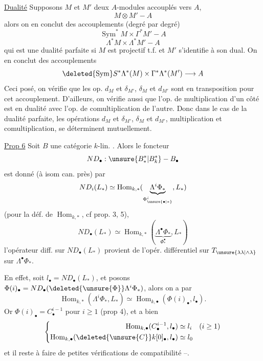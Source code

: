 \uline{Dualité} Supposons $M$ et $M'$ deux $A$-modules accouplés vers $A$,
\[
M\otimes M'-A
\]
alors on en conclut des accouplements (degré par degré)
\[
\operatorname{Sym}^*M\times\Gamma^*M'-A
\]
\[
\Lambda^*M\times\Lambda^*M'-A
\]
qui est une dualité parfaite si $M$ est projectif t.f. et $M'$ s'identifie à son dual. On en conclut des accouplements
\[
\deleted{\operatorname{Sym}}S^*\Lambda^*(M)\times\Gamma^*\Lambda^*(M')\longrightarrow A
\]
Ceci posé, on vérifie que les op. $d_M$ et $\delta_{M'}$, $\delta_M$ et $d_{M'}$ sont  en transposition pour cet accouplement. D'ailleurs, on vérifie aussi que l'op. de multiplication d'un côté est en dualité avec l'op. de comultiplication de l'autre. Donc dans le cas de la dualité parfaite, les opérations $d_M$ et $\delta_{M'}$, $\delta_M$ et $d_{M'}$, multiplication et comultiplication, se déterminent mutuellement.


\uline{Prop 6} Soit $B$ une catégorie $k$-lin. .
Alors le foncteur
\[
ND_\bullet:\unsure{B^*_*|B^*_k}\mathbin{-}B_\bullet
\]
est donné (à isom can. près) par
\[
ND_i(L_*)\simeq\operatorname{Hom}_{k,*}
(\underbrace{\Lambda^i\Phi_*}_{\Phi^i_{\unsure{\bullet|*}}},L_*)
\]
(pour la déf. de $\operatorname{Hom}_{k,*}$, cf prop. 3, 5),
\[
ND_\bullet(L_*)\simeq\operatorname{Hom}_{k,*}
(\underbrace{\Lambda^\bullet\Phi_*}_{\Phi_*^\bullet},L_*)
\]
l'opérateur diff. sur $ND_\bullet(L_*)$ provient de l'opér. différentiel sur
$T_{\unsure{\lambda\lambda|\wedge\lambda}}$ sur $\Lambda^\bullet\Phi_*$.

En effet,  soit $l_\bullet=ND_\bullet(L_*)$,
et posons $\Phi(i)_\bullet=ND_\bullet(\deleted{\unsure{\Phi}}\Lambda^i\Phi_*)$,
alors on a par 
\[
\operatorname{Hom}_{k,*}(\Lambda^i\Phi_*,L_*)
\simeq\operatorname{Hom}_{k,\bullet}(\Phi(i)_\bullet,l_\bullet).
\]
Or $\Phi(i)_\bullet=C_\bullet^{i-1}$ pour $i\geq1$ (prop 4), et
a bien
\[
\left\{\begin{aligned}
\operatorname{Hom}_{k,\bullet}(C_\bullet^{i-1},l_\bullet)&\simeq l_i\quad(i\geq1)\\
\operatorname{Hom}_{k,\bullet}(\deleted{\unsure{C}}k[0]_\bullet,l_\bullet)&\simeq l_0
\end{aligned}\right.
\]
et il reste à faire de petites vérifications de compatibilité --.

